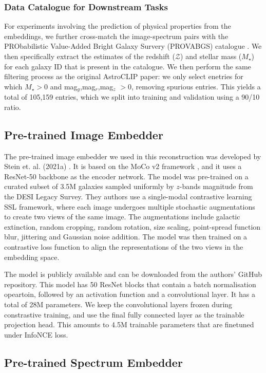 \documentclass[a4paper,12pt]{article}
\begin{document}
\subsubsection*{Data Catalogue for Downstream Tasks}
For experiments involving the prediction of physical properties from the embeddings, we further cross-match the image-spectrum pairs with the PRObabilistic Value-Added Bright Galaxy Survery (PROVABGS) catalogue \cite{PROVABGS}. We then specifically extract the estimates of the redshift ($\mathcal{Z}$) and stellar mass ($M_{\star}$) for each galaxy ID that is present in the catalogue. We then perform the same filtering process as the original AstroCLIP paper: we only select enetries for which $M_{\star} > 0$ and mag$_g$,mag$_r$,mag$_z$ $> 0$, removing spurious entries. This yields a total of 105,159 entries, which we split into training and validation using a 90/10 ratio.



\subsection{Pre-trained Image Embedder} 
The pre-trained image embedder we used in this reconstruction was developed by Stein et. al. (2021a) \cite{stein}. It is based on the MoCo v2 framework \cite{mocov2}, and it uses a ResNet-50 backbone as the encoder network. The model was pre-trained on a curated subset of 3.5M galaxies sampled uniformly by $z$-bands magnitude from the DESI Legacy Survey. They authors use a single-modal contrastive learning SSL framework, where each image undergoes multiple stochastic augmentations to create two views of the same image. The augmentations include galactic extinction, random cropping, random rotation, size scaling, point-spread function blur, jittering and Gaussian noise addition. The model was then trained on a contrastive loss function to align the representations of the two views in the embedding space. 

The model is publicly available and can be downloaded from the authors' GitHub repository. This model has 50 ResNet blocks that contain a batch normalisation opeartoin, followed by an activation function and a convolutional layer. It has a total of 28M parameters. We keep the convolutional layers frozen during constrastive training, and use the final fully connected layer as the trainable projection head. This amounts to 4.5M trainable parameters that are finetuned under InfoNCE loss. 


\subsection{Pre-trained Spectrum Embedder}
\end{document}
